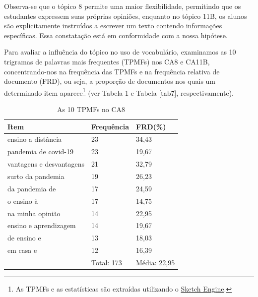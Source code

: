 \documentclass[portuguese]{textolivre}
\begin{document}
Observa-se que o tópico 8 permite uma maior flexibilidade, permitindo que os estudantes expressem suas próprias opiniões, enquanto no tópico 11B, os alunos são explicitamente instruídos a escrever um texto contendo informações específicas. Essa constatação está em conformidade com a nossa hipótese.

Para avaliar a influência do tópico no uso de vocabulário, examinamos as 10 trigramas de palavras mais frequentes (TPMFs) nos CA8 e CA11B, concentrando-nos na frequência das TPMFs e na frequência relativa de documento (FRD), ou seja, a proporção de documentos nos quais um determinado item aparece\footnote{As TPMFs e as estatísticas são extraídas utilizando o \href{https://www.sketchengine.eu/}{Sketch Engine}.} (ver Tabela \ref{tab6} e Tabela \ref{tab7}, respectivamente). 


\begin{table}[h]
\centering
\begin{threeparttable}
\caption{As 10 TPMFs no CA8}
\label{tab6}
\begin{tabular}{lll}
\toprule
Item                     & Frequência & FRD(\%)     \\ 
\midrule
ensino a distância       & 23         & 34,43        \\ 
pandemia de covid-19     & 23         & 19,67        \\ 
vantagens e desvantagens & 21         & 32,79        \\ 
surto da pandemia        & 19         & 26,23        \\ 
da pandemia de           & 17         & 24,59        \\ 
o ensino à               & 17         & 14,75        \\ 
na minha opinião         & 14         & 22,95        \\ 
ensino e aprendizagem    & 14         & 19,67        \\ 
de ensino e              & 13         & 18,03        \\ 
em casa e                & 12         & 16,39        \\ 
                         & Total: 173 & Média: 22,95 \\ 
\bottomrule
\end{tabular}
\end{threeparttable}
\end{table}
\end{document}
